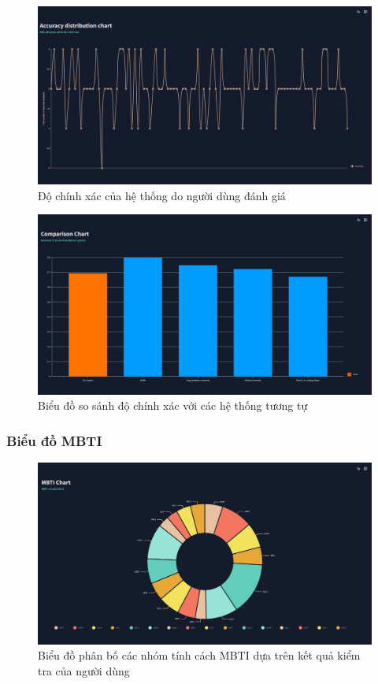 \begin{figure}[H]
    \centering
    \includegraphics[width=0.75\linewidth]{images/accu.png}
    \vspace{0.6cm}
    \caption{Độ chính xác của hệ thống do người dùng đánh giá}
\end{figure}

\begin{figure}[H]
    \centering
    \includegraphics[width=0.75\linewidth]{images/compare.png}
    \vspace{0.6cm}
    \caption{Biểu đồ so sánh độ chính xác với các hệ thống tương tự}
\end{figure}

\subsubsection{Biểu đồ MBTI}
\begin{figure}[H]
    \centering
    \includegraphics[width=0.75\linewidth]{mbtiChart.png}
    \vspace{0.6cm}
    \caption{Biểu đồ phân bố các nhóm tính cách MBTI dựa trên kết quả kiểm tra của người dùng}
\end{figure}

